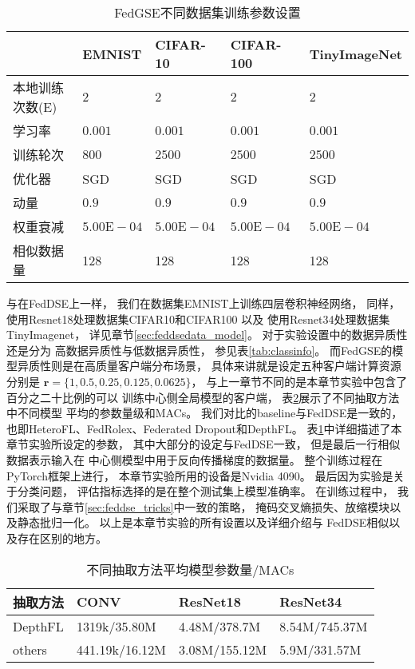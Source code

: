 \begin{table}[thbp]
    \caption{\label{tab:train_fedgse_info}FedGSE不同数据集训练参数设置}
    \begin{tabularx}{\linewidth}{l X<{\centering} X<{\centering} X<{\centering} X<{\centering}}
        \toprule
        & EMNIST & CIFAR-10 & CIFAR-100 & TinyImageNet \\ \hline
        本地训练次数(E) & $2$ & $2$ & $2$ & $2$ \\ 
        学习率 & $0.001$ & $0.001$ & $0.001$ & $0.001$ \\ 
        训练轮次 & $800$ & $2500$ & $2500$ & $2500$ \\ 
        优化器 & SGD & SGD & SGD & SGD \\ 
        动量 & $0.9$ & $0.9$ & $0.9$ & $0.9$ \\ 
        权重衰减 & $5.00\text{E}-04$ & $5.00\text{E}-04$ & $5.00\text{E}-04$ & $5.00\text{E}-04$ \\ 
        相似数据量 & 128 & 128 & 128 & 128 \\ 
        \bottomrule
    \end{tabularx}
\end{table}
与在FedDSE上一样，
我们在数据集EMNIST上训练四层卷积神经网络，
同样，
使用Resnet18处理数据集CIFAR10和CIFAR100
以及
使用Resnet34处理数据集TinyImagenet，
详见章节\ref{sec:feddsedata_model}。
对于实验设置中的数据异质性还是分为
高数据异质性与低数据异质性，
参见表\ref{tab:classinfo}。
而FedGSE的模型异质性则是在高质量客户端分布场景，
具体来讲就是设定五种客户端计算资源分别是
$\mathbf{r} = \{ 1, 0.5, 0.25, 0.125, 0.0625 \}$，
与上一章节不同的是本章节实验中包含了百分之二十比例的可以
训练中心侧全局模型的客户端，
表\ref{tab:paraAndmac}展示了不同抽取方法中不同模型
平均的参数量级和MACs。
我们对比的baseline与FedDSE是一致的，
也即HeteroFL、FedRolex、Federated Dropout和DepthFL。
表\ref{tab:train_fedgse_info}中详细描述了本章节实验所设定的参数，
其中大部分的设定与FedDSE一致，
但是最后一行相似数据表示输入在
中心侧模型中用于反向传播梯度的数据量。
整个训练过程在PyTorch框架上进行，
本章节实验所用的设备是Nvidia 4090。
最后因为实验是关于分类问题，
评估指标选择的是在整个测试集上模型准确率。
在训练过程中，
我们采取了与章节\ref{sec:feddse_tricks}中一致的策略，
掩码交叉熵损失、放缩模块以及静态批归一化。
以上是本章节实验的所有设置以及详细介绍与
FedDSE相似以及存在区别的地方。
\begin{table}[thbp]
    \caption{\label{tab:paraAndmac}不同抽取方法平均模型参数量/MACs}
    \begin{tabularx}{\linewidth}{l  X<{\centering} X<{\centering} X<{\centering}}
        \toprule
        抽取方法 & CONV & ResNet18 & ResNet34  \\ \hline
        DepthFL &  1319k/35.80M &  4.48M/378.7M  & 8.54M/745.37M  \\ 
        others & 441.19k/16.12M  & 3.08M/155.12M &  5.9M/331.57M  \\ 
        \bottomrule
    \end{tabularx}
\end{table}


